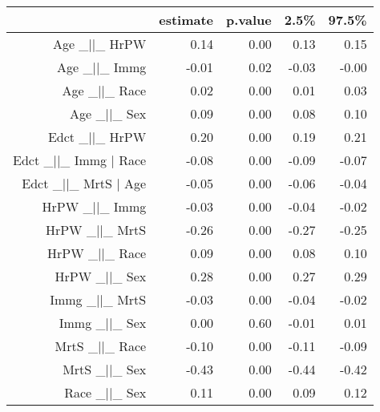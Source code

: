 \begin{table}[ht]
\centering
\begin{tabular}{rrrrr}
  \hline
 & estimate & p.value & 2.5\% & 97.5\% \\ 
  \hline
Age \_$|$$|$\_ HrPW & 0.14 & 0.00 & 0.13 & 0.15 \\ 
  Age \_$|$$|$\_ Immg & -0.01 & 0.02 & -0.03 & -0.00 \\ 
  Age \_$|$$|$\_ Race & 0.02 & 0.00 & 0.01 & 0.03 \\ 
  Age \_$|$$|$\_ Sex & 0.09 & 0.00 & 0.08 & 0.10 \\ 
  Edct \_$|$$|$\_ HrPW & 0.20 & 0.00 & 0.19 & 0.21 \\ 
  Edct \_$|$$|$\_ Immg $|$ Race & -0.08 & 0.00 & -0.09 & -0.07 \\ 
  Edct \_$|$$|$\_ MrtS $|$ Age & -0.05 & 0.00 & -0.06 & -0.04 \\ 
  HrPW \_$|$$|$\_ Immg & -0.03 & 0.00 & -0.04 & -0.02 \\ 
  HrPW \_$|$$|$\_ MrtS & -0.26 & 0.00 & -0.27 & -0.25 \\ 
  HrPW \_$|$$|$\_ Race & 0.09 & 0.00 & 0.08 & 0.10 \\ 
  HrPW \_$|$$|$\_ Sex & 0.28 & 0.00 & 0.27 & 0.29 \\ 
  Immg \_$|$$|$\_ MrtS & -0.03 & 0.00 & -0.04 & -0.02 \\ 
  Immg \_$|$$|$\_ Sex & 0.00 & 0.60 & -0.01 & 0.01 \\ 
  MrtS \_$|$$|$\_ Race & -0.10 & 0.00 & -0.11 & -0.09 \\ 
  MrtS \_$|$$|$\_ Sex & -0.43 & 0.00 & -0.44 & -0.42 \\ 
  Race \_$|$$|$\_ Sex & 0.11 & 0.00 & 0.09 & 0.12 \\ 
   \hline
\end{tabular}
\end{table}
